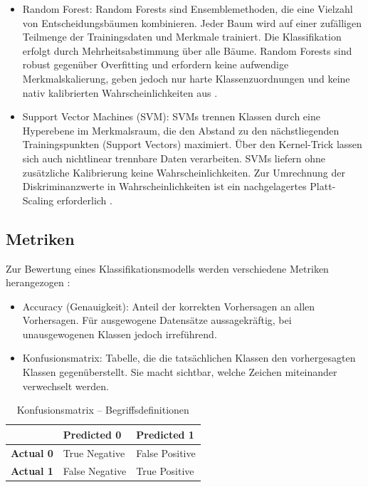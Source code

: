 \begin{itemize}
    \item Random Forest: Random Forests sind Ensemblemethoden, die eine Vielzahl von Entscheidungsbäumen kombinieren. Jeder Baum wird auf einer zufälligen Teilmenge der Trainingsdaten und Merkmale trainiert. Die Klassifikation erfolgt durch Mehrheitsabstimmung über alle Bäume. Random Forests sind robust gegenüber Overfitting und erfordern keine aufwendige Merkmalskalierung, geben jedoch nur harte Klassenzuordnungen und keine nativ kalibrierten Wahrscheinlichkeiten aus \cite[S. ~1 ff.]{rahmanComparisonSVMRandom2025}.
    \item Support Vector Machines (SVM): SVMs trennen Klassen durch eine Hyperebene im Merkmalsraum, die den Abstand zu den nächstliegenden Trainingspunkten (Support Vectors) maximiert. Über den Kernel-Trick lassen sich auch nichtlinear trennbare Daten verarbeiten. SVMs liefern ohne zusätzliche Kalibrierung keine Wahrscheinlichkeiten. Zur Umrechnung der Diskriminanzwerte in Wahrscheinlichkeiten ist ein nachgelagertes Platt-Scaling erforderlich \cite[S. ~1 ff.]{rahmanComparisonSVMRandom2025}.
\end{itemize}

\subsection{Metriken}\label{sub:metriken}

Zur Bewertung eines Klassifikationsmodells werden verschiedene Metriken herangezogen \cite[S. ~54 ff.]{fritzHandGestureRecognition}:

\begin{itemize}
    \item Accuracy (Genauigkeit): Anteil der korrekten Vorhersagen an allen Vorhersagen. Für ausgewogene Datensätze aussagekräftig, bei unausgewogenen Klassen jedoch irreführend.
    \item Konfusionsmatrix: Tabelle, die die tatsächlichen Klassen den vorhergesagten Klassen gegenüberstellt. Sie macht sichtbar, welche Zeichen miteinander verwechselt werden.
\end{itemize}

\begin{table}[H]
    \centering
    \label{tab:confusion-matrix-definition}
    \begin{tabular}{|l|l|l|}
        \hline
        & \textbf{Predicted 0} & \textbf{Predicted 1} \\
        \hline
        \textbf{Actual 0} & True Negative & False Positive \\
        \hline
        \textbf{Actual 1} & False Negative & True Positive \\
        \hline
    \end{tabular}
    \caption{Konfusionsmatrix -- Begriffsdefinitionen}
\end{table}



